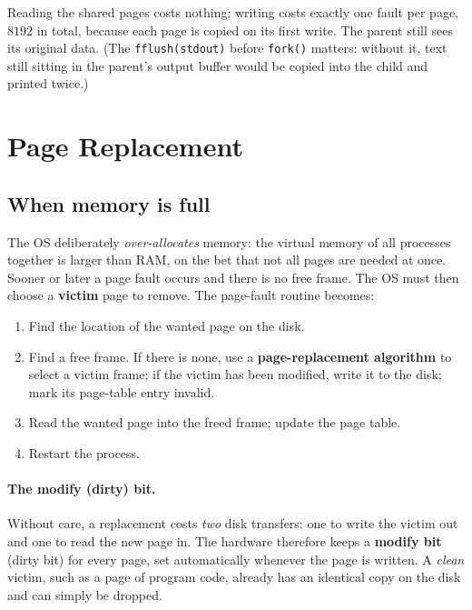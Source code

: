 \documentclass[11pt,a4paper]{article}
\newcommand{\term}[1]{\textbf{\color{mintdeep}#1}}
\newcommand{\cmd}[1]{\texttt{#1}}
\begin{document}
Reading the shared pages costs nothing; writing costs exactly one fault per page, $8192$ in total, because each page is copied on its first write. The parent still sees its original data. (The \cmd{fflush(stdout)} before \cmd{fork()} matters: without it, text still sitting in the parent's output buffer would be copied into the child and printed twice.)

\section{Page Replacement}
\label{sec:repl}

\subsection{When memory is full}

The OS deliberately \emph{over-allocates} memory: the virtual memory of all processes together is larger than RAM, on the bet that not all pages are needed at once. Sooner or later a page fault occurs and there is no free frame. The OS must then choose a \term{victim} page to remove. The page-fault routine becomes:

\begin{enumerate}[leftmargin=1.4em]
  \item Find the location of the wanted page on the disk.
  \item Find a free frame. If there is none, use a \term{page-replacement algorithm} to select a victim frame; if the victim has been modified, write it to the disk; mark its page-table entry invalid.
  \item Read the wanted page into the freed frame; update the page table.
  \item Restart the process.
\end{enumerate}

\paragraph{The modify (dirty) bit.} Without care, a replacement costs \emph{two} disk transfers: one to write the victim out and one to read the new page in. The hardware therefore keeps a \term{modify bit} (dirty bit) for every page, set automatically whenever the page is written. A \emph{clean} victim, such as a page of program code, already has an identical copy on the disk and can simply be dropped.
\end{document}
